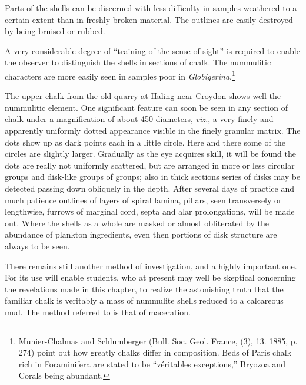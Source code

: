 \documentclass[a4paper, 12pt, oneside]{article}
\begin{document}
Parts of the shells can be discerned with less difficulty in samples weathered to a certain extent than in freshly broken material. The outlines are easily destroyed by being bruised or rubbed.

A very considerable degree of ``training of the sense of sight'' is required to enable the observer to distinguish the shells in sections of chalk. The nummulitic characters are more easily seen in samples poor in \emph{Globigerina}.\footnote{Munier-Chalmas and Schlumberger (Bull. Soc. Geol. France, (3), 13. 1885, p. 274) point out how greatly chalks differ in composition. Beds of Paris chalk rich in Foraminifera are stated to be ``véritables exceptions,'' Bryozoa and Corals being abundant.}

The upper chalk from the old quarry at Haling near Croydon shows well the nummulitic element. One significant feature can soon be seen in any section of chalk under a magnification of about 450 diameters, \emph{viz.}, a very finely and apparently uniformly dotted appearance visible in the finely granular matrix. The dots show up as dark points each in a little circle. Here and there some of the circles are slightly larger. Gradually as the eye acquires skill, it will be found the dots are really not uniformly scattered, but are arranged in more or less circular groups and disk-like groups of groups; also in thick sections series of disks may be detected passing down obliquely in the depth. After several days of practice and much patience outlines of layers of spiral lamina, pillars, seen transversely or lengthwise, furrows of marginal cord, septa and alar prolongations, will be made out. Where the shells as a whole are masked or almost obliterated by the abundance of plankton ingredients, even then portions of disk structure are always to be seen.

There remains still another method of investigation, and a highly important one. For its use will enable students, who at present may well be skeptical concerning the revelations made in this chapter, to realize the astonishing truth that the familiar chalk is veritably a mass of nummulite shells reduced to a calcareous mud. The method referred to is that of maceration.
\end{document}

